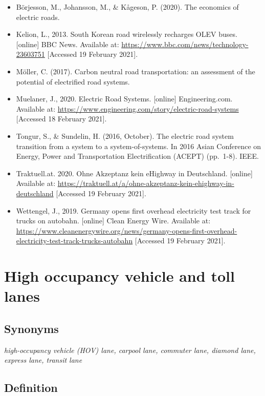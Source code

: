 \documentclass[
]{book}
\providecommand{\tightlist}{%
  \setlength{\itemsep}{0pt}\setlength{\parskip}{0pt}}
\begin{document}
\begin{itemize}
\tightlist
\item
  Börjesson, M., Johansson, M., \& Kågeson, P. (2020). The economics of electric roads.
\item
  Kelion, L., 2013. South Korean road wirelessly recharges OLEV buses. {[}online{]} BBC News. Available at: \url{https://www.bbc.com/news/technology-23603751} {[}Accessed 19 February 2021{]}.
\item
  Möller, C. (2017). Carbon neutral road transportation: an assessment of the potential of electrified road systems.
\item
  Muelaner, J., 2020. Electric Road Systems. {[}online{]} Engineering.com. Available at: \url{https://www.engineering.com/story/electric-road-systems} {[}Accessed 18 February 2021{]}.
\item
  Tongur, S., \& Sundelin, H. (2016, October). The electric road system transition from a system to a system-of-systems. In 2016 Asian Conference on Energy, Power and Transportation Electrification (ACEPT) (pp.~1-8). IEEE.
\item
  Traktuell.at. 2020. Ohne Akzeptanz kein eHighway in Deutschland. {[}online{]} Available at: \url{https://traktuell.at/a/ohne-akzeptanz-kein-ehighway-in-deutschland} {[}Accessed 19 February 2021{]}.
\item
  Wettengel, J., 2019. Germany opens first overhead electricity test track for trucks on autobahn. {[}online{]} Clean Energy Wire. Available at: \url{https://www.cleanenergywire.org/news/germany-opens-first-overhead-electricity-test-track-trucks-autobahn} {[}Accessed 19 February 2021{]}.
\end{itemize}

\hypertarget{high_occupancy}{%
\section{High occupancy vehicle and toll lanes}\label{high_occupancy}}

\hypertarget{synonyms-3}{%
\subsection*{Synonyms}\label{synonyms-3}}

\emph{high-occupancy vehicle (HOV) lane, carpool lane, commuter lane, diamond lane, express lane, transit lane}

\hypertarget{definition-3}{%
\subsection*{Definition}\label{definition-3}}
\end{document}
